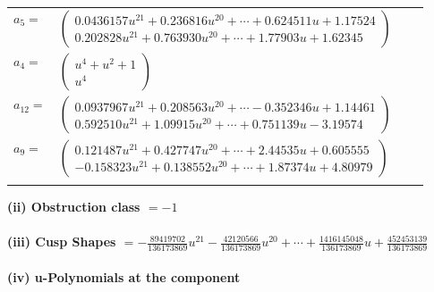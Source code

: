 \documentclass[1p]{elsarticle_modified}
\theoremstyle{definition}
\begin{document}
\begin{tabular}{m{7pt} m{180pt} m{7pt} m{180pt} }
\flushright $a_{5}=$&$\begin{pmatrix}0.0436157 u^{21}+0.236816 u^{20}+\cdots+0.624511 u+1.17524\\0.202828 u^{21}+0.763930 u^{20}+\cdots+1.77903 u+1.62345\end{pmatrix}$ \\
\flushright $a_{4}=$&$\begin{pmatrix}u^4+u^2+1\\u^4\end{pmatrix}$ \\
\flushright $a_{12}=$&$\begin{pmatrix}0.0937967 u^{21}+0.208563 u^{20}+\cdots-0.352346 u+1.14461\\0.592510 u^{21}+1.09915 u^{20}+\cdots+0.751139 u-3.19574\end{pmatrix}$ \\
\flushright $a_{9}=$&$\begin{pmatrix}0.121487 u^{21}+0.427747 u^{20}+\cdots+2.44535 u+0.605555\\-0.158323 u^{21}+0.138552 u^{20}+\cdots+1.87374 u+4.80979\end{pmatrix}$\\&\end{tabular}
\flushleft \textbf{(ii) Obstruction class $= -1$}\\~\\
\flushleft \textbf{(iii) Cusp Shapes $= -\frac{89419702}{136173869} u^{21}-\frac{42120566}{136173869} u^{20}+\cdots+\frac{1416145048}{136173869} u+\frac{452453139}{136173869}$}\\~\\
\newpage\renewcommand{\arraystretch}{1}
\flushleft \textbf{(iv) u-Polynomials at the component}\newline \\
\end{document}
